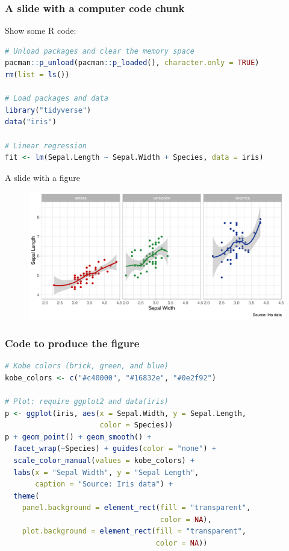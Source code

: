 \documentclass[12pt]{beamer}
\begin{document}
\begin{frame}[fragile]\frametitle{A slide with a computer code chunk}

Show some R code:

\begin{lstlisting}[language=R]
# Unload packages and clear the memory space
pacman::p_unload(pacman::p_loaded(), character.only = TRUE)
rm(list = ls())

# Load packages and data
library("tidyverse")
data("iris")

# Linear regression
fit <- lm(Sepal.Length ~ Sepal.Width + Species, data = iris)
\end{lstlisting}

\end{frame}



\begin{frame}{A slide with a figure}

\begin{figure}
\includegraphics[width = \linewidth]{figures/iris}
\end{figure}

\end{frame}

\begin{frame}[fragile]\frametitle{Code to produce the figure}

\begin{lstlisting}[language=R]
# Kobe colors (brick, green, and blue)
kobe_colors <- c("#c40000", "#16832e", "#0e2f92")

# Plot: require ggplot2 and data(iris)
p <- ggplot(iris, aes(x = Sepal.Width, y = Sepal.Length, 
                      color = Species))
p + geom_point() + geom_smooth() + 
  facet_wrap(~Species) + guides(color = "none") + 
  scale_color_manual(values = kobe_colors) + 
  labs(x = "Sepal Width", y = "Sepal Length", 
       caption = "Source: Iris data") + 
  theme(
    panel.background = element_rect(fill = "transparent", 
                                    color = NA),
    plot.background = element_rect(fill = "transparent", 
                                   color = NA))
\end{lstlisting}

\end{frame}
\end{document}
